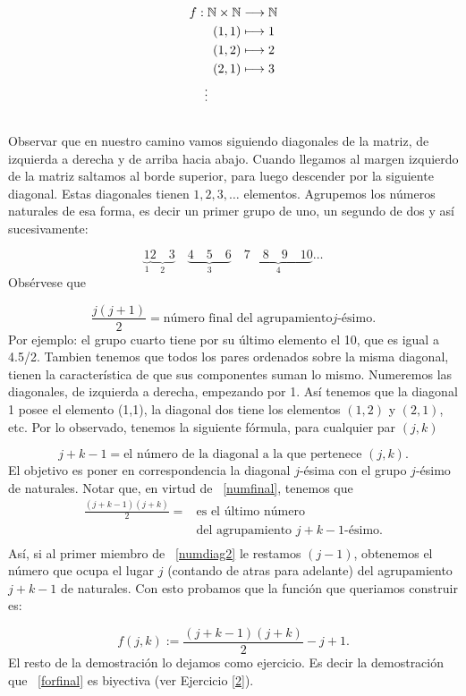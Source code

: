 \begin{demo}
\begin{eqnarray}
    f:\nn\times\nn&\longrightarrow\nn\nonumber \\
    (1,1)&\longmapsto 1\nonumber \\
    (1,2)&\longmapsto 2\nonumber \\
     (2,1)&\longmapsto 3\nonumber\\
        &\hspace{-29pt}\vdots\nonumber \\
        \nonumber
\end{eqnarray}
Observar que en nuestro camino vamos siguiendo diagonales de
la matriz, de izquierda a derecha y de arriba hacia abajo. Cuando llegamos al margen izquierdo de la matriz
saltamos al borde superior, para luego descender por la
siguiente diagonal. Estas diagonales tienen $1, 2, 3, \dots$
elementos. Agrupemos los números naturales de esa forma, es
decir un primer grupo de uno, un segundo de dos y así
sucesivamente:

\[\underbrace{1}_{1} \underbrace{2\quad 3}_{2}\quad\underbrace{4\quad 5\quad
6}_{3}\quad \underbrace{7\quad 8\quad  9\quad 10}_{4}\dots
\]
Obsérvese que

\begin{equation}\label{numfinal}
\frac{j(j +1)}{2}=\text{número final del agrupamiento
$j$-ésimo}.
\end{equation}
Por ejemplo: el grupo cuarto tiene por su último elemento el 10,
que es igual a 4.5/2. Tambien tenemos que todos los pares
ordenados sobre la misma diagonal, tienen la característica
de que sus componentes suman lo mismo. Numeremos las diagonales,
de izquierda a derecha, empezando por 1. Así tenemos que la
diagonal 1 posee el elemento (1,1), la diagonal dos tiene los
elementos $(1,2)$ y $(2,1)$, etc. Por lo observado, tenemos la
siguiente fórmula, para cualquier par $(j,k)$

\begin{equation}\label{numdiag}
j+k-1=\text{el número de la diagonal a la que pertenece } (j,k).
\end{equation}
 El objetivo es poner en correspondencia la diagonal
$j$-ésima con el grupo $j$-ésimo de naturales. Notar que, en
virtud de ~\eqref{numfinal}, tenemos que
\begin{equation}\label{numdiag2}
\begin{split}\frac{(j+k-1)(j+k)}{2}=&\text{es el último número}\\
 & \text{del agrupamiento $j+k-1$-ésimo}.\\
\end{split}
\end{equation}
Así, si al primer miembro de ~\eqref{numdiag2} le restamos
$(j-1)$, obtenemos el número que ocupa el lugar $j$ (contando de
atras para adelante) del agrupamiento $j+k-1$ de naturales. Con
esto probamos que la función que queriamos construir es:


\begin{equation}\label{forfinal}
f(j,k):=\frac{(j+k-1)(j+k)}{2}-j+1.
\end{equation}
El resto de la demostración lo dejamos como ejercicio. Es decir la   demostración que ~\eqref{forfinal} es
biyectiva (ver Ejercicio \vref{2}).
\end{demo}

